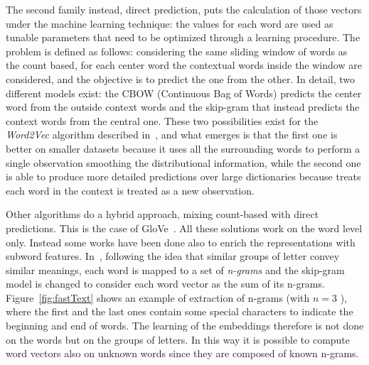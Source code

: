 The second family instead, direct prediction, puts the calculation of those vectors under the machine learning technique: the values for each word are used as tunable parameters that need to be optimized through a learning procedure. The problem is defined as follows: considering the same sliding window of words as the count based, for each center word the contextual words inside the window are considered, and the objective is to predict the one from the other. In detail, two different models exist: the CBOW (Continuous Bag of Words) predicts the center word from the outside context words and the skip-gram that instead predicts the context words from the central one. These two possibilities exist for the \textit{Word2Vec }algorithm described in~\cite{mikolov2013efficient}, and what emerges is that the first one is better on smaller datasets because it uses all the surrounding words to perform a single observation smoothing the distributional information, while the second one is able to produce more detailed predictions over large dictionaries because treats each word in the context is treated as a new observation.

Other algorithms do a hybrid approach, mixing count-based with direct predictions. This is the case of GloVe~\cite{pennington2014glove}. All these solutions work on the word level only. Instead some works have been done also to enrich the representations with subword features. In~\cite{bojanowski2016enriching}, following the idea that similar groups of letter convey similar meanings, each word is mapped to a set of \textit{n-grams} and the skip-gram model is changed to consider each word vector as the sum of its n-grams. Figure~\ref{fig:fastText} shows an example of extraction of n-grams (with  \( n=3 \) ), where the first and the last ones contain some special characters to indicate the beginning and end of words. The learning of the embeddings therefore is not done on the words but on the groups of letters. In this way it is possible to compute word vectors also on unknown words since they are composed of known n-grams.


